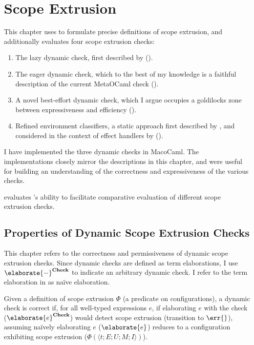 \newcommand{\scoped}[2][\Theta]{\textsf{Scoped}_{{#1}, {#2}}}

\chapter{Scope Extrusion}\label{chapter:scope-extrusion}
This chapter uses \calculusName{} to formulate precise definitions of scope extrusion, and additionally evaluates four scope extrusion checks: 
\begin{enumerate}
  \item The lazy dynamic check, first described by \citet{kiselyov-14} ().
  \item The eager dynamic check, which to the best of my knowledge is a faithful description of the current MetaOCaml check \citep{kiselyov-16} ().
  \item A novel best-effort dynamic check, which I argue occupies a goldilocks zone between expressiveness and efficiency ().
  \item Refined environment classifiers, a static approach first described by \citet{kiselyov-16}, and considered in the context of effect handlers by \citet{isoda-24} ().
\end{enumerate}
I have implemented the three dynamic checks in MacoCaml. The implementations closely mirror the descriptions in this chapter, and were useful for building an understanding of the correctness and expressiveness of the various checks. 

 evaluates \calculusName{}'s ability to facilitate comparative evaluation of different scope extrusion checks. 
\section{Properties of Dynamic Scope Extrusion Checks}
This chapter refers to the correctness and permissiveness of dynamic scope extrusion checks. Since dynamic checks are defined as term elaborations, I use $\elaborate{-}^{\textbf{Check}}$ to indicate an arbitrary dynamic check. I refer to the term elaboration in  as naïve elaboration.

Given a definition of scope extrusion $\Phi$ (a predicate on configurations), a dynamic check is correct if, for all well-typed \sourceLang{} expressions $e$, if elaborating $e$ with the check ($\elaborate{e}^{\textbf{Check}}$) would detect scope extrusion (transition to $\err{}$), assuming naïvely elaborating $e$ ($\elaborate{e}$) reduces to a configuration exhibiting scope extrusion ($\Phi(\langle t;E;U;M;I\rangle)$).

